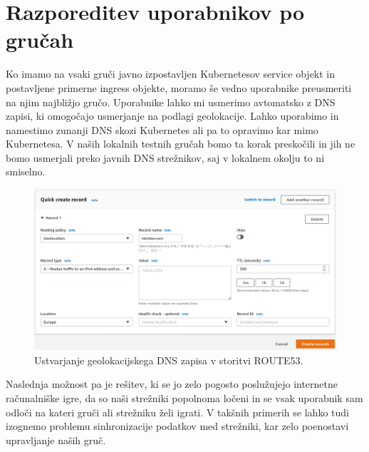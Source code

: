 \documentclass[a4paper, 12pt]{book}
\begin{document}
\section{Razporeditev uporabnikov po gručah}
Ko imamo na vsaki gruči javno izpostavljen Kubernetesov service objekt in postavljene primerne ingress objekte, moramo še vedno uporabnike preusmeriti na njim najbližjo gručo.
Uporabnike lahko mi usmerimo avtomatsko z DNS zapisi, ki omogočajo usmerjanje na podlagi geolokacije.
Lahko uporabimo in namestimo zunanji DNS skozi Kubernetes ali pa to opravimo kar mimo Kubernetesa.
V naših lokalnih testnih gručah bomo ta korak preskočili in jih ne bomo usmerjali preko javnih DNS strežnikov, saj v lokalnem okolju to ni smiselno.
\begin{figure}[h]
\begin{center}
\includegraphics[width=1.0\textwidth]{images/geolokacijski-dns.png}
\end{center}
\caption{Ustvarjanje geolokacijskega DNS zapisa v storitvi ROUTE53.}
\label{primer-ustvarjanje-geolokacijskega-zapisa}
\end{figure}

Naslednja možnost pa je rešitev, ki se jo zelo pogosto poslužujejo internetne računalniške igre, da so naši strežniki popolnoma ločeni in se vsak uporabnik sam odloči na kateri gruči ali strežniku želi igrati.
V takšnih primerih se lahko tudi izognemo problemu sinhronizacije podatkov med strežniki, kar zelo poenostavi upravljanje naših gruč.
\end{document}
